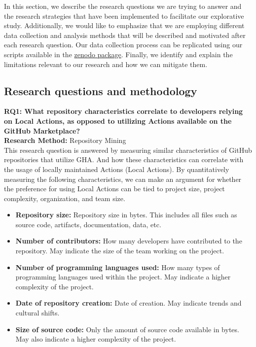 \documentclass[conference]{IEEEtran}
\begin{document}
    In this section, we describe the research questions we are trying to answer and the research strategies that have been implemented to facilitate our explorative study. Additionally, we would like to emphasize that we are employing different data collection and analysis methods that will be described and motivated after each research question. Our data collection process can be replicated using our scripts available in the \href{https://github.com//orgs/community/discussions/43861} {zenodo package}\cite{Marof2024}. Finally, we identify and explain the limitations relevant to our research and how we can mitigate them. 

    \subsection{Research questions and methodology}
        \textbf{RQ1: What repository characteristics correlate to developers relying on Local Actions, as opposed to utilizing Actions available on the GitHub Marketplace?}
        \\

        \textbf{Research Method:}  Repository Mining \\
            This research question is answered by measuring similar characteristics of GitHub repositories that utilize GHA. And how these characteristics can correlate with the usage of locally maintained Actions (Local Actions). By quantitatively measuring the following characteristics, we can make an argument for whether the preference for using Local Actions can be tied to project size, project complexity, organization, and team size. \\
          \begin{itemize}
            \item \textbf{Repository size:} Repository size in bytes. This includes all files such as source code, artifacts, documentation, data, etc.
            \item \textbf{Number of contributors:} How many developers have contributed to the repository. May indicate the size of the team working on the project.
            \item	\textbf{Number of programming languages used:} How many types of programming languages used within the project. May indicate a higher complexity of the project.
            \item \textbf{Date of repository creation:} Date of creation. May indicate trends and cultural shifts.\\
            \item \textbf{Size of source code:} Only the amount of source code available in bytes. May also indicate a higher complexity of the project. \\
          \end{itemize}
          
\end{document}
